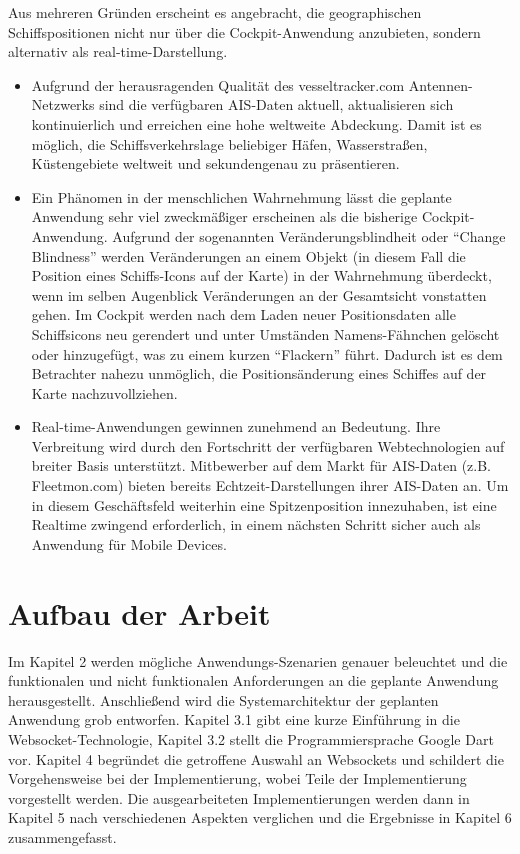 Aus mehreren Gründen erscheint es angebracht, die geographischen Schiffspositionen nicht nur über die Cockpit-Anwendung anzubieten, sondern alternativ als real-time-Darstellung. 
\begin{itemize}

\item Aufgrund der herausragenden Qualität des vesseltracker.com Antennen-Netzwerks sind die verfügbaren AIS-Daten aktuell, aktualisieren sich kontinuierlich und erreichen eine hohe weltweite Abdeckung. Damit ist es möglich, die Schiffsverkehrslage beliebiger Häfen, Wasserstraßen, Küstengebiete weltweit und sekundengenau zu präsentieren. 

\item Ein Phänomen in der menschlichen Wahrnehmung lässt die geplante Anwendung sehr viel zweckmäßiger erscheinen als die bisherige Cockpit-Anwendung. Aufgrund der sogenannten Veränderungsblindheit oder “Change Blindness” werden Veränderungen an einem Objekt (in diesem Fall die Position eines Schiffs-Icons auf der Karte) in der Wahrnehmung überdeckt, wenn im selben Augenblick Veränderungen an der Gesamtsicht vonstatten gehen. Im Cockpit werden nach dem Laden neuer Positionsdaten alle Schiffsicons neu gerendert und unter Umständen Namens-Fähnchen gelöscht oder hinzugefügt, was zu einem kurzen “Flackern” führt. Dadurch ist es dem Betrachter nahezu unmöglich, die Positionsänderung eines Schiffes auf der Karte nachzuvollziehen.
  
\item Real-time-Anwendungen gewinnen zunehmend an Bedeutung. Ihre Verbreitung wird durch den Fortschritt der verfügbaren Webtechnologien auf breiter Basis unterstützt. Mitbewerber auf dem Markt für AIS-Daten (z.B. Fleetmon.com) bieten bereits Echtzeit-Darstellungen ihrer AIS-Daten an. Um in diesem Geschäftsfeld weiterhin eine Spitzenposition innezuhaben, ist eine Realtime zwingend erforderlich, in einem nächsten Schritt sicher auch als Anwendung für Mobile Devices.
\end{itemize}


\section{Aufbau der Arbeit}\label{s.Aufbau der Arbeit}
Im Kapitel 2 werden mögliche Anwendungs-Szenarien genauer beleuchtet und die funktionalen und nicht funktionalen Anforderungen an die geplante Anwendung herausgestellt. Anschließend wird die Systemarchitektur der geplanten Anwendung grob entworfen.
Kapitel 3.1 gibt eine kurze Einführung in die Websocket-Technologie, Kapitel 3.2 stellt die Programmiersprache Google Dart vor.
Kapitel 4 begründet die getroffene Auswahl an Websockets und schildert die Vorgehensweise bei der Implementierung, wobei Teile der Implementierung vorgestellt werden.
Die ausgearbeiteten Implementierungen werden dann in Kapitel 5 nach verschiedenen Aspekten verglichen und die Ergebnisse in Kapitel 6 zusammengefasst.

